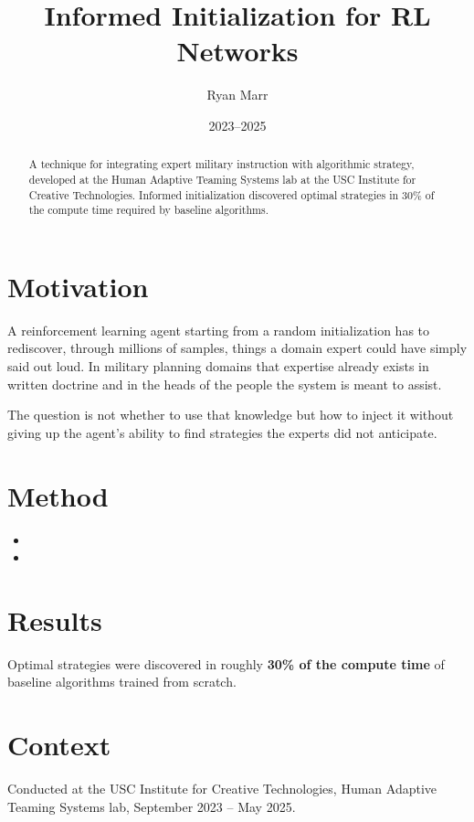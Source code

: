 \documentclass{article}
\title{Informed Initialization for RL Networks}
\author{Ryan Marr}
\date{2023--2025}
\begin{document}
\maketitle

\begin{abstract}
A technique for integrating expert military instruction with algorithmic strategy,
developed at the Human Adaptive Teaming Systems lab at the USC Institute for
Creative Technologies. Informed initialization discovered optimal strategies in
30\% of the compute time required by baseline algorithms.
\end{abstract}

\section{Motivation}

A reinforcement learning agent starting from a random initialization has to
rediscover, through millions of samples, things a domain expert could have simply
said out loud. In military planning domains that expertise already exists in
written doctrine and in the heads of the people the system is meant to assist.

The question is not whether to use that knowledge but how to inject it without
giving up the agent's ability to find strategies the experts did not anticipate.

\section{Method}

\begin{itemize}
  \item {}

  \item {}
\end{itemize}

\section{Results}

Optimal strategies were discovered in roughly \textbf{30\% of the compute time} of
baseline algorithms trained from scratch.

\section{Context}

Conducted at the USC Institute for Creative Technologies, Human Adaptive Teaming
Systems lab, September 2023 -- May 2025.
\end{document}
